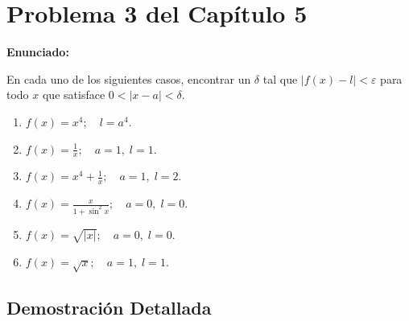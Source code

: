 \section*{Problema 3 del Capítulo 5}

\textbf{Enunciado:}

En cada uno de los siguientes casos, encontrar un $\delta$ tal que $|f(x) - l| < \varepsilon$ para todo $x$ que satisface $0 < |x - a| < \delta$.

\begin{enumerate}
    \item $f(x) = x^4; \quad l = a^4$.
    \item $f(x) = \frac{1}{x}; \quad a = 1, \; l = 1$.
    \item $f(x) = x^4 + \frac{1}{x}; \quad a = 1, \; l = 2$.
    \item $f(x) = \frac{x}{1 + \sin^2 x}; \quad a = 0, \; l = 0$.
    \item $f(x) = \sqrt{|x|}; \quad a = 0, \; l = 0$.
    \item $f(x) = \sqrt{x}; \quad a = 1, \; l = 1$.
\end{enumerate}

\subsection*{Demostración Detallada}

